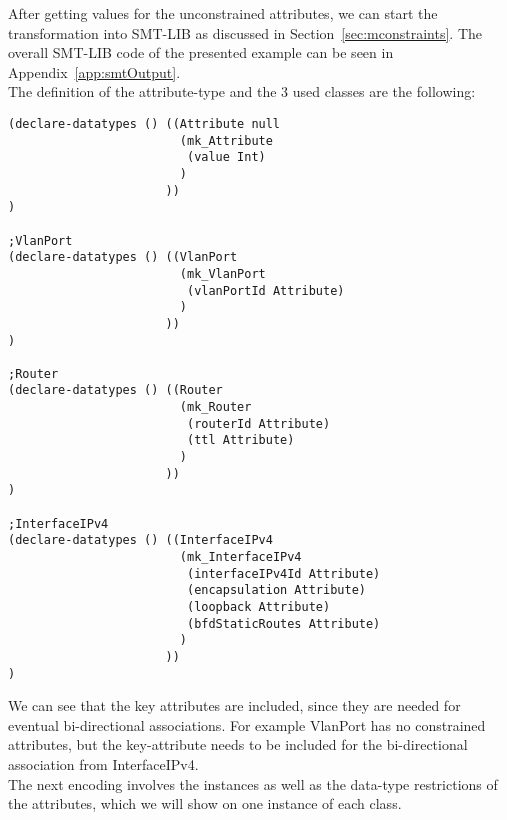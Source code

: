 After getting values for the unconstrained attributes, we can start the transformation into SMT-LIB as discussed in Section~\ref{sec:mconstraints}. The overall SMT-LIB code of the presented example can be seen in Appendix~\ref{app:smtOutput}. \\
The definition of the attribute-type and the 3 used classes are the following:
\begin{verbatim}
(declare-datatypes () ((Attribute null
	                    (mk_Attribute
	                     (value Int)
	                    )
	                  ))
)

;VlanPort
(declare-datatypes () ((VlanPort
                        (mk_VlanPort
                         (vlanPortId Attribute)
                        )
                      ))
)

;Router
(declare-datatypes () ((Router 
                        (mk_Router
                         (routerId Attribute)
                         (ttl Attribute)
                        )
                      ))
)

;InterfaceIPv4 
(declare-datatypes () ((InterfaceIPv4
                        (mk_InterfaceIPv4
                         (interfaceIPv4Id Attribute)
                         (encapsulation Attribute)
                         (loopback Attribute)
                         (bfdStaticRoutes Attribute)
                        )
                      ))
)
\end{verbatim}

We can see that the key attributes are included, since they are needed for eventual bi-directional associations. For example \textsf{VlanPort} has no constrained attributes, but the key-attribute needs to be included for the bi-directional association from \textsf{InterfaceIPv4}. \\

The next encoding involves the instances as well as the data-type restrictions of the attributes, which we will show on one instance of each class.

